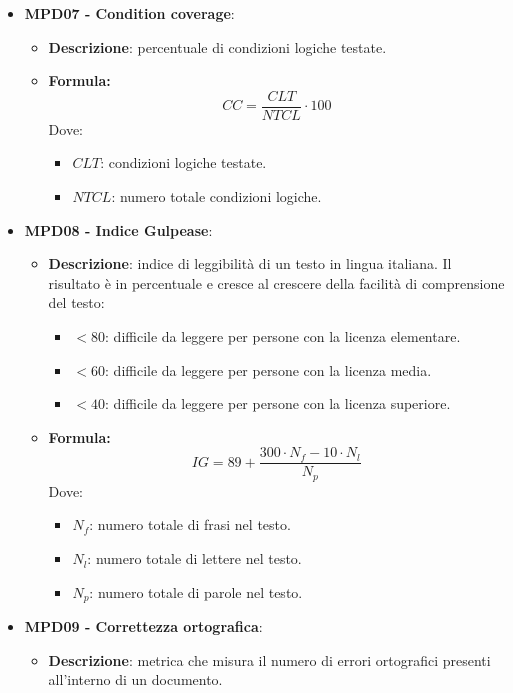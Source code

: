 \documentclass[10pt]{article}
\begin{document}
\begin{justify}
\begin{itemize}
    \item \textbf{MPD07 - Condition coverage}:
    \begin{itemize}
        \item   \textbf{Descrizione}: percentuale di condizioni logiche testate.
        \item   \textbf{Formula:}
            \[
            CC = \frac{CLT}{NTCL} \cdot 100
            \]
            Dove:
            \begin{itemize}
                \item $CLT$: condizioni logiche testate.
                \item $NTCL$: numero totale condizioni logiche.
            \end{itemize}
    \end{itemize}

    \item \textbf{MPD08 - Indice Gulpease}:
    \begin{itemize}
        \item \textbf{Descrizione}: indice di leggibilità di un testo in lingua italiana. Il risultato è in percentuale e cresce al crescere della facilità di comprensione del testo:
            \begin{itemize}
                \item $< 80$: difficile da leggere per persone con la licenza elementare.
                \item $< 60$: difficile da leggere per persone con la licenza media.
                \item $< 40$: difficile da leggere per persone con la licenza superiore.
            \end{itemize}
        \item \textbf{Formula:}
        \[
        IG = 89 + \frac{300 \cdot N_f - 10 \cdot N_l}{N_p}
        \]
        Dove:
        \begin{itemize}
            \item $N_f$: numero totale di frasi nel testo.
            \item $N_l$: numero totale di lettere nel testo.
            \item $N_p$: numero totale di parole nel testo.
        \end{itemize}
    \end{itemize}

    \item \textbf{MPD09 - Correttezza ortografica}:
    \begin{itemize}
        \item \textbf{Descrizione}: metrica che misura il numero di errori ortografici presenti all'interno di un documento.
    \end{itemize}
\end{itemize}


\end{justify}
\end{document}
